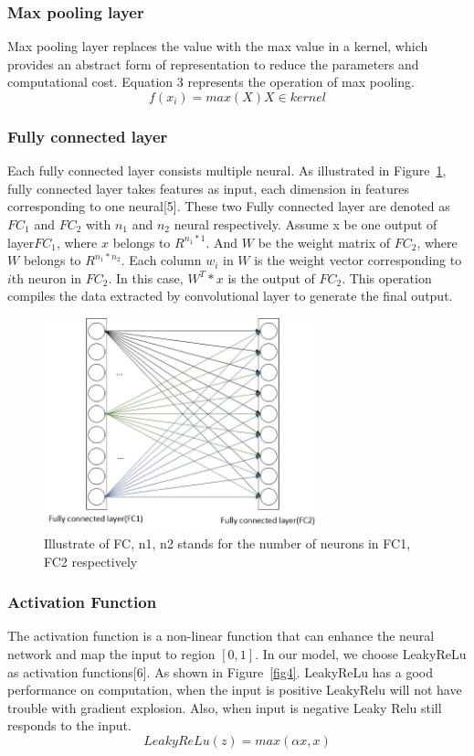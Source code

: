 \documentclass[runningheads]{llncs}
\begin{document}
\subsubsection{Max pooling layer}
Max pooling layer replaces the value with the max value in a kernel, which provides an abstract form of representation to reduce the parameters and computational cost. Equation 3 represents the operation of max pooling.
\begin{equation}
	f(x_i)=max(X) X\in kernel
\end{equation}

\subsubsection{Fully connected layer}
Each fully connected layer consists multiple neural. As illustrated in Figure~\ref{fig3}, fully connected layer takes features as input, each dimension in features corresponding to one neural[5]. These two Fully connected layer are denoted as $FC_1$ and $FC_2$ with $n_1$ and $n_2$ neural respectively. Assume x be one output of layer$FC_1$, where $x$ belongs to $R^{{n_1}*1}$. And $W$ be the weight matrix of $FC_2$, where $W$ belongs to $R^{{n_1}*{n_2}}$. Each column $w_i$ in $W$ is the weight vector corresponding to $i$th neuron in $FC_2$. In this case, $W^T*x$ is the output of $FC_2$. This operation compiles the data extracted by convolutional layer to generate the final output.

\begin{figure}
	\centering\includegraphics[width=8cm]{fc.jpg}
	\caption{Illustrate of FC, n1, n2 stands for the number of neurons in FC1, FC2 respectively} \label{fig3}
\end{figure}


\subsubsection{Activation Function}
The activation function is a non-linear function that can enhance the neural network and map the input to region $[0,1]$. In our model, we choose LeakyReLu as activation functions[6]. As shown in Figure~\ref{fig4}. LeakyReLu has a good performance on computation, when the input is positive LeakyRelu will not have trouble with gradient explosion. Also, when input is negative Leaky Relu still responds to the input.
\begin{equation}
	LeakyReLu(z)=max(\alpha x,x)
\end{equation}
\end{document}
